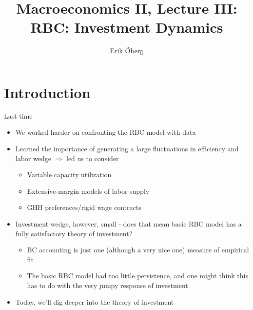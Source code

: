 \documentclass[9pt,xcolor={dvipsnames}]{beamer}
\title[RBC: investment dynamics]{Macroeconomics II, Lecture III:\\
	  RBC: Investment Dynamics}
\author{Erik {\"O}berg}
\date{}
\newcommand{\bit}{\begin{itemize}}
\newcommand{\eit}{\end{itemize}}
\begin{document}
\begin{frame}
\maketitle
\end{frame}

\section{Introduction}


\begin{frame}{Last time}

\bit
\setlength\itemsep{1.5em} 

\item We worked harder on confronting the RBC model with data

\item Learned the importance of generating a large fluctuations in efficiency and labor wedge $\Rightarrow$ led us to consider
\bit
\setlength\itemsep{0.5em} 
\item Variable capacity utilization

\item Extensive-margin models of labor supply

\item GHH preferences/rigid wage contracts
\eit

\item Investment wedge, however, small - does that mean basic RBC model has a fully satisfactory theory of investment?
\bit
\setlength\itemsep{0.5em} 
	\item BC accounting is just one (although a very nice one) measure of empirical fit
	
	\item The basic RBC model had too little persistence, and one might think this has to do with the very jumpy response of investment
\eit

\item Today, we'll dig deeper into the theory of investment

\eit

\end{frame}
\end{document}
